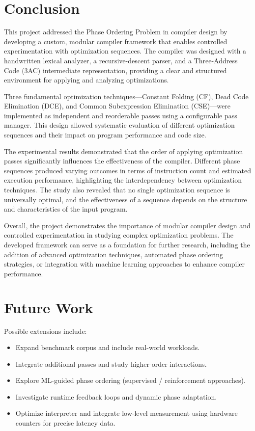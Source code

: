 \documentclass[conference]{IEEEtran}
\begin{document}
\section{Conclusion}
This project addressed the Phase Ordering Problem in compiler design by developing a custom, modular compiler framework that enables controlled experimentation with optimization sequences. The compiler was designed with a handwritten lexical analyzer, a recursive-descent parser, and a Three-Address Code (3AC) intermediate representation, providing a clear and structured environment for applying and analyzing optimizations.

Three fundamental optimization techniques—Constant Folding (CF), Dead Code Elimination (DCE), and Common Subexpression Elimination (CSE)—were implemented as independent and reorderable passes using a configurable pass manager. This design allowed systematic evaluation of different optimization sequences and their impact on program performance and code size.

The experimental results demonstrated that the order of applying optimization passes significantly influences the effectiveness of the compiler. Different phase sequences produced varying outcomes in terms of instruction count and estimated execution performance, highlighting the interdependency between optimization techniques. The study also revealed that no single optimization sequence is universally optimal, and the effectiveness of a sequence depends on the structure and characteristics of the input program.

Overall, the project demonstrates the importance of modular compiler design and controlled experimentation in studying complex optimization problems. The developed framework can serve as a foundation for further research, including the addition of advanced optimization techniques, automated phase ordering strategies, or integration with machine learning approaches to enhance compiler performance.

\section{Future Work}
Possible extensions include:
\begin{itemize}
    \item Expand benchmark corpus and include real-world workloads.
    \item Integrate additional passes and study higher-order interactions.
    \item Explore ML-guided phase ordering (supervised / reinforcement approaches).
    \item Investigate runtime feedback loops and dynamic phase adaptation.
    \item Optimize interpreter and integrate low-level measurement using hardware counters for precise latency data.
\end{itemize}
\end{document}
